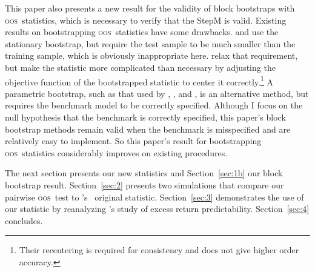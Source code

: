 \documentclass[10pt,fleqn,draft]{article}
\newcommand\citepos[2][]{\citeauthor{#2}'s \citeyearpar[#1]{#2}}
\newcommand\poscw{\citeauthor{ClW:06}'s \citeyearpar{ClW:06,ClW:07}}
\theoremstyle{definition}
\newcommand{\oos}{\textsc{oos}}
\begin{document}
This paper also presents a new result for the validity of block
bootstraps with \oos\ statistics, which is necessary to verify that
the StepM is valid.  Existing results on bootstrapping \oos\
statistics have some drawbacks.  \citet{Whi:00} and \citet{Han:05} use
the stationary bootstrap, but require the test sample to be much
smaller than the training sample, which is obviously inappropriate
here.  \citet{CoS:07} relax that requirement, but make the statistic
more complicated than necessary by adjusting the objective function of
the bootstrapped statistic to center it correctly.\footnote{Their
  recentering is required for consistency and does not give higher
  order accuracy.}  A parametric bootstrap, such as that used by
\cite{Mar:95}, \cite{Lut:99}, and \citet{ClM:11}, is an alternative
method, but requires the benchmark model to be correctly specified.
Although I focus on the null hypothesis that the benchmark is
correctly specified, this paper's block bootstrap methods remain valid
when the benchmark is misspecified and are relatively easy to
implement.  So this paper's result for bootstrapping \oos\ statistics
considerably improves on existing procedures.

The next section presents our new statistics and Section~\ref{sec:1b}
our block bootstrap result.  Section~\ref{sec:2} presents two
simulations that compare our pairwise \oos\ test to \poscw\ original
statistic.  Section~\ref{sec:3} demonstrates the use of our statistic
by reanalyzing \citepos{GoW:08} study of excess return
predictability. Section~\ref{sec:4} concludes.
\end{document}
